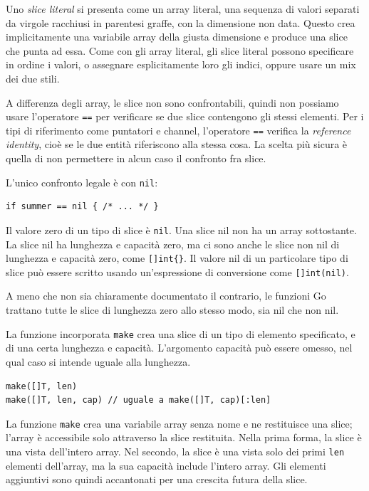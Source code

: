 \documentclass[../../thesis.tex]{subfiles}
\begin{document}
    Uno \textit{slice literal} si presenta come un array literal, una sequenza di valori separati da virgole racchiusi in parentesi graffe, con la dimensione non data.
    Questo crea implicitamente una variabile array della giusta dimensione e produce una slice che punta ad essa.
    Come con gli array literal, gli slice literal possono specificare in ordine i valori, o assegnare esplicitamente loro gli indici, oppure usare un mix dei due stili.
    \hfill \vspace{12pt}

    A differenza degli array, le slice non sono confrontabili, quindi non possiamo usare l'operatore \verb"==" per verificare se due slice contengono gli stessi elementi.
    Per i tipi di riferimento come puntatori e channel, l'operatore \verb"==" verifica la \textit{reference identity}, cioè se le due entità riferiscono alla stessa cosa.
    La scelta più sicura è quella di non permettere in alcun caso il confronto fra slice.
    \hfill \vspace{12pt}

    L'unico confronto legale è con \verb"nil":
    \begin{lstlisting}[frame = single, label = {lst:lstlisting3-2.6}]
if summer == nil { /* ... */ }
    \end{lstlisting}
    Il valore zero di un tipo di slice è \verb"nil".
    Una slice nil non ha un array sottostante.
    La slice nil ha lunghezza e capacità zero, ma ci sono anche le slice non nil di lunghezza e capacità zero, come \verb"[]int{}".
    Il valore nil di un particolare tipo di slice può essere scritto usando un'espressione di conversione come \verb"[]int(nil)".
    \hfill \vspace{12pt}

    A meno che non sia chiaramente documentato il contrario, le funzioni Go trattano tutte le slice di lunghezza zero allo stesso modo, sia nil che non nil.
    \hfill \vspace{12pt}

    La funzione incorporata \verb"make" crea una slice di un tipo di elemento specificato, e di una certa lunghezza e capacità.
    L'argomento capacità può essere omesso, nel qual caso si intende uguale alla lunghezza.
    \begin{lstlisting}[frame = single, label = {lst:lstlisting3-2.7}]
make([]T, len)
make([]T, len, cap) // uguale a make([]T, cap)[:len]
    \end{lstlisting}
    La funzione \verb"make" crea una variabile array senza nome e ne restituisce una slice;
    l'array è accessibile solo attraverso la slice restituita.
    Nella prima forma, la slice è una vista dell'intero array.
    Nel secondo, la slice è una vista solo dei primi \verb"len" elementi dell'array, ma la sua capacità include l'intero array.
    Gli elementi aggiuntivi sono quindi accantonati per una crescita futura della slice.
    \hfill \vspace{12pt}
\end{document}
